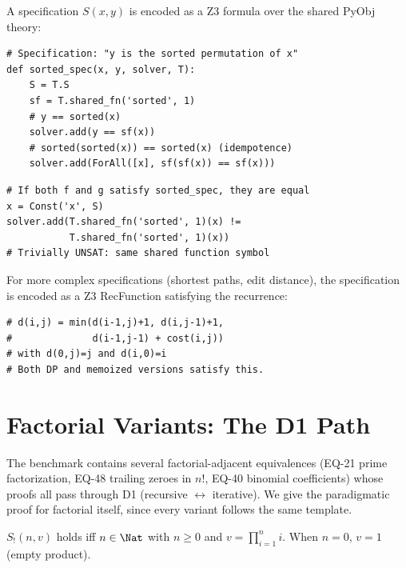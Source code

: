 A specification $S(x, y)$ is encoded as a Z3 formula over the
shared PyObj theory:

\begin{lstlisting}[caption={Specification encoding in Z3}]
# Specification: "y is the sorted permutation of x"
def sorted_spec(x, y, solver, T):
    S = T.S
    sf = T.shared_fn('sorted', 1)
    # y == sorted(x)
    solver.add(y == sf(x))
    # sorted(sorted(x)) == sorted(x) (idempotence)
    solver.add(ForAll([x], sf(sf(x)) == sf(x)))
\end{lstlisting}

\begin{lstlisting}[caption={Specification uniqueness check}]
# If both f and g satisfy sorted_spec, they are equal
x = Const('x', S)
solver.add(T.shared_fn('sorted', 1)(x) !=
           T.shared_fn('sorted', 1)(x))
# Trivially UNSAT: same shared function symbol
\end{lstlisting}

For more complex specifications (shortest paths, edit distance),
the specification is encoded as a Z3 RecFunction satisfying the
recurrence:

\begin{lstlisting}[caption={Edit distance specification}]
# d(i,j) = min(d(i-1,j)+1, d(i,j-1)+1,
#              d(i-1,j-1) + cost(i,j))
# with d(0,j)=j and d(i,0)=i
# Both DP and memoized versions satisfy this.
\end{lstlisting}


\section{Factorial Variants: The D1 Path}
\label{sec:factorial-variants}

The benchmark contains several factorial-adjacent equivalences
(EQ-21 prime factorization, EQ-48 trailing zeroes in $n!$,
EQ-40 binomial coefficients) whose proofs all pass through D1
(recursive $\leftrightarrow$ iterative).  We give the paradigmatic
proof for factorial itself, since every variant follows the same
template.

\begin{definition}
$S_{!}(n, v)$ holds iff $n \in \Nat$ with $n \ge 0$ and
$v = \prod_{i=1}^{n} i$.  When $n = 0$, $v = 1$ (empty product).
\end{definition}

